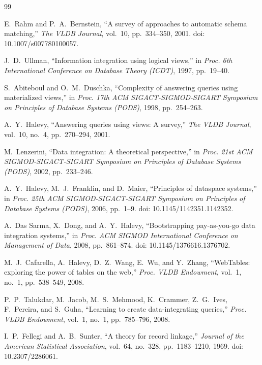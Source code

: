 \documentclass[12pt,a4paper]{report}
\begin{document}
\begin{thebibliography}{99}

 E.~Rahm and P.~A.~Bernstein, ``A survey of approaches to automatic schema matching,'' \emph{The VLDB Journal}, vol.~10, pp.~334--350, 2001. doi: 10.1007/s007780100057.

 J.~D.~Ullman, ``Information integration using logical views,'' in \emph{Proc. 6th International Conference on Database Theory (ICDT)}, 1997, pp.~19--40.

 S.~Abiteboul and O.~M.~Duschka, ``Complexity of answering queries using materialized views,'' in \emph{Proc. 17th ACM SIGACT-SIGMOD-SIGART Symposium on Principles of Database Systems (PODS)}, 1998, pp.~254--263.

 A.~Y.~Halevy, ``Answering queries using views: A survey,'' \emph{The VLDB Journal}, vol.~10, no.~4, pp.~270--294, 2001.

 M.~Lenzerini, ``Data integration: A theoretical perspective,'' in \emph{Proc. 21st ACM SIGMOD-SIGACT-SIGART Symposium on Principles of Database Systems (PODS)}, 2002, pp.~233--246.

 A.~Y.~Halevy, M.~J.~Franklin, and D.~Maier, ``Principles of dataspace systems,'' in \emph{Proc. 25th ACM SIGMOD-SIGACT-SIGART Symposium on Principles of Database Systems (PODS)}, 2006, pp.~1--9. doi: 10.1145/1142351.1142352.

 A.~Das Sarma, X.~Dong, and A.~Y.~Halevy, ``Bootstrapping pay-as-you-go data integration systems,'' in \emph{Proc. ACM SIGMOD International Conference on Management of Data}, 2008, pp.~861--874. doi: 10.1145/1376616.1376702.

 M.~J.~Cafarella, A.~Halevy, D.~Z.~Wang, E.~Wu, and Y.~Zhang, ``WebTables: exploring the power of tables on the web,'' \emph{Proc. VLDB Endowment}, vol.~1, no.~1, pp.~538--549, 2008.

 P.~P.~Talukdar, M.~Jacob, M.~S.~Mehmood, K.~Crammer, Z.~G.~Ives, F.~Pereira, and S.~Guha, ``Learning to create data-integrating queries,'' \emph{Proc. VLDB Endowment}, vol.~1, no.~1, pp.~785--796, 2008.

 I.~P.~Fellegi and A.~B.~Sunter, ``A theory for record linkage,'' \emph{Journal of the American Statistical Association}, vol.~64, no.~328, pp.~1183--1210, 1969. doi: 10.2307/2286061.


\end{thebibliography}
\end{document}
